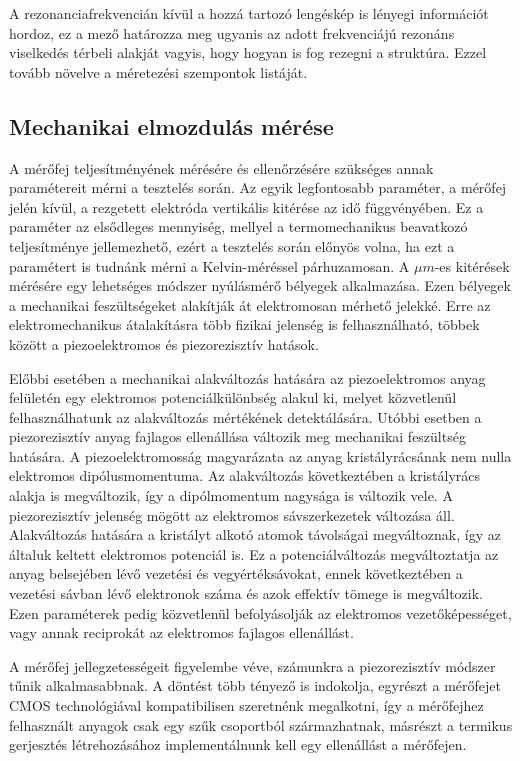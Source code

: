 A rezonanciafrekvencián kívül a hozzá tartozó lengéskép is lényegi információt hordoz, ez a mező határozza meg ugyanis az adott frekvenciájú rezonáns viselkedés térbeli alakját vagyis, hogy hogyan is fog rezegni a struktúra. Ezzel tovább növelve a méretezési szempontok listáját.

\subsection{Mechanikai elmozdulás mérése}
\label{sec:piezo}

A mérőfej teljesítményének mérésére és ellenőrzésére szükséges annak paramétereit mérni a tesztelés során. Az egyik legfontosabb paraméter, a mérőfej jelén kívül, a rezgetett elektróda vertikális kitérése az idő függvényében. Ez a paraméter az elsődleges mennyiség, mellyel a termomechanikus beavatkozó teljesítménye jellemezhető, ezért a tesztelés során előnyös volna, ha ezt a paramétert is tudnánk mérni a Kelvin-méréssel párhuzamosan. A $\mu m$-es kitérések mérésére egy lehetséges módszer nyúlásmérő bélyegek alkalmazása. Ezen bélyegek a mechanikai feszültségeket alakítják át elektromosan mérhető jelekké. Erre az elektromechanikus átalakításra több fizikai jelenség is felhasználható, többek között a piezoelektromos és piezorezisztív hatások.

Előbbi esetében a mechanikai alakváltozás hatására az piezoelektromos anyag felületén egy elektromos potenciálkülönbség alakul ki, melyet közvetlenül felhasználhatunk az alakváltozás mértékének detektálására. Utóbbi esetben a piezorezisztív anyag fajlagos ellenállása változik meg mechanikai feszültség hatására. A piezoelektromosság magyarázata az anyag kristályrácsának nem nulla elektromos dipólusmomentuma. Az alakváltozás következtében a kristályrács alakja is megváltozik, így a dipólmomentum nagysága is változik vele. A piezorezisztív jelenség mögött az elektromos sávszerkezetek változása áll. Alakváltozás hatására a kristályt alkotó atomok távolságai megváltoznak, így az általuk keltett elektromos potenciál is. Ez a potenciálváltozás megváltoztatja az anyag belsejében lévő vezetési és vegyértéksávokat, ennek következtében a vezetési sávban lévő elektronok száma és azok effektív tömege is megváltozik. Ezen paraméterek pedig közvetlenül befolyásolják az elektromos vezetőképességet, vagy annak reciprokát az elektromos fajlagos ellenállást.

A mérőfej jellegzetességeit figyelembe véve, számunkra a piezorezisztív módszer tűnik alkalmasabbnak. A döntést több tényező is indokolja, egyrészt a mérőfejet CMOS technológiával kompatibilisen szeretnénk megalkotni, így a mérőfejhez felhasznált anyagok csak egy szűk csoportból származhatnak, másrészt a termikus gerjesztés létrehozásához implementálnunk kell egy ellenállást a mérőfejen.

